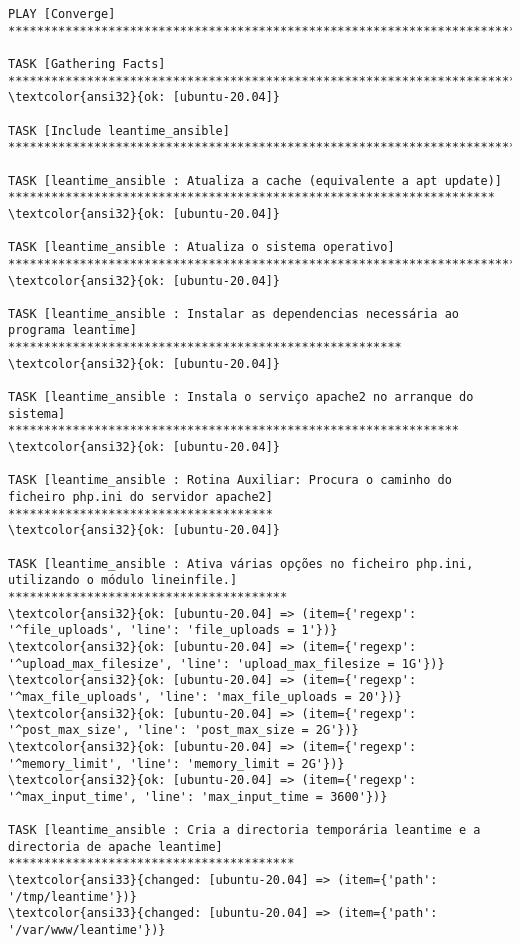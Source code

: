 \documentclass{scrartcl}
\begin{document}
\begin{Verbatim}
PLAY [Converge] **************************************************************************************************************************

TASK [Gathering Facts] *******************************************************************************************************************
\textcolor{ansi32}{ok: [ubuntu-20.04]}

TASK [Include leantime_ansible] **********************************************************************************************************

TASK [leantime_ansible : Atualiza a cache (equivalente a apt update)] ********************************************************************
\textcolor{ansi32}{ok: [ubuntu-20.04]}

TASK [leantime_ansible : Atualiza o sistema operativo] ***********************************************************************************
\textcolor{ansi32}{ok: [ubuntu-20.04]}

TASK [leantime_ansible : Instalar as dependencias necessária ao programa leantime] *******************************************************
\textcolor{ansi32}{ok: [ubuntu-20.04]}

TASK [leantime_ansible : Instala o serviço apache2 no arranque do sistema] ***************************************************************
\textcolor{ansi32}{ok: [ubuntu-20.04]}

TASK [leantime_ansible : Rotina Auxiliar: Procura o caminho do ficheiro php.ini do servidor apache2] *************************************
\textcolor{ansi32}{ok: [ubuntu-20.04]}

TASK [leantime_ansible : Ativa várias opções no ficheiro php.ini, utilizando o módulo lineinfile.] ***************************************
\textcolor{ansi32}{ok: [ubuntu-20.04] => (item={'regexp': '^file_uploads', 'line': 'file_uploads = 1'})}
\textcolor{ansi32}{ok: [ubuntu-20.04] => (item={'regexp': '^upload_max_filesize', 'line': 'upload_max_filesize = 1G'})}
\textcolor{ansi32}{ok: [ubuntu-20.04] => (item={'regexp': '^max_file_uploads', 'line': 'max_file_uploads = 20'})}
\textcolor{ansi32}{ok: [ubuntu-20.04] => (item={'regexp': '^post_max_size', 'line': 'post_max_size = 2G'})}
\textcolor{ansi32}{ok: [ubuntu-20.04] => (item={'regexp': '^memory_limit', 'line': 'memory_limit = 2G'})}
\textcolor{ansi32}{ok: [ubuntu-20.04] => (item={'regexp': '^max_input_time', 'line': 'max_input_time = 3600'})}

TASK [leantime_ansible : Cria a directoria temporária leantime e a directoria de apache leantime] ****************************************
\textcolor{ansi33}{changed: [ubuntu-20.04] => (item={'path': '/tmp/leantime'})}
\textcolor{ansi33}{changed: [ubuntu-20.04] => (item={'path': '/var/www/leantime'})}


\end{Verbatim}
\end{document}
